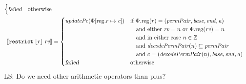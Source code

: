 \documentclass[a4paper]{article}
\newcommand{\update}[2]{[#1 \mapsto #2]}
\newcommand{\sem}[1]{\left\llbracket #1 \right\rrbracket}
\newcommand\lau[1]{{\color{purple} \sf \footnotesize {LS: #1}}\\}
\newcommand{\var}[1]{\mathit{#1}}
\newcommand{\rv}{\var{rv}}
\newcommand{\gl}{\var{g}}
\newcommand{\addr}{\var{a}}
\newcommand{\start}{\var{base}}
\newcommand{\addrend}{\var{end}}
\newcommand{\perm}{\var{perm}}
\newcommand{\permp}{\var{permPair}}
\newcommand{\stdcap}[1][(\perm,\gl)]{\left(#1,\start,\addrend,\addr \right)}
\newcommand{\plainproj}[1]{\mathrm{#1}}
\newcommand{\memreg}[1][\Phi]{#1.\plainproj{reg}}
\newcommand{\updateReg}[3][\Phi]{#1\update{\plainproj{reg}.#2}{#3}}
\newcommand{\failed}{\textsl{failed}}
\newcommand{\plainfun}[2]{
  \ifthenelse{\equal{#2}{}}
  {\mathit{#1}}
  {\mathit{#1}(#2)}
}
\newcommand{\decodePermPair}{\plainfun{decodePermPair}}
\newcommand{\stdUpdatePc}[1]{\plainfun{updatePc}{#1}}
\newcommand{\ints}{\mathbb{Z}}
\newcommand{\refreg}[1]{\lfloor #1 \rfloor}
\newcommand{\zinstr}[1]{\mathtt{#1}}
\newcommand{\twoinstr}[3]{\zinstr{#1} \; #2 \; #3}
\newcommand{\restricttwo}[2]{\twoinstr{restrict}{#1}{#2}}
\begin{document}
\begin{align*}
\begin{cases}
                                               \failed               & \text{otherwise}
                                             \end{cases} 
  \\
  \sem{\restricttwo{\refreg{r}}{\rv}}           & =
                                                  \begin{cases}
                                                    \stdUpdatePc{\updateReg{r}{\var{c}}}  &
                                                    \arraycolsep=0pt
                                                    \begin{array}[t]{l}
                                                      \text{if $\memreg(r) = \stdcap[\permp]$}\\
                                                      \quad\text{and either $\rv = n$ or $\memreg(\rv) = n$}\\
                                                      \quad\text{and in either case $n \in \ints$}\\
                                                      \quad\text{and $\decodePermPair{n}\sqsubseteq \permp$}\\
                                                      \quad\text{and $c = (\decodePermPair{n},\start,\addrend,\addr)$}
                                                    \end{array}\\
                                                    \failed                   & \text{otherwise}
                                                  \end{cases} 
\end{align*}
\lau{Do we need other arithmetic operators than plus?}
\end{document}
